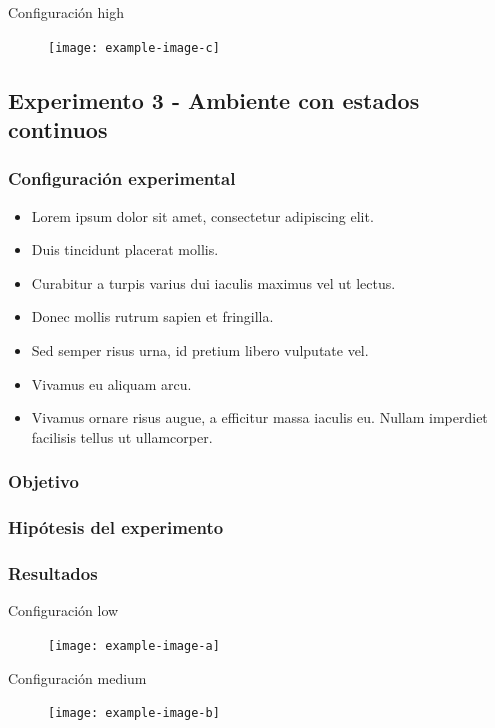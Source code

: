 Configuración high
\begin{figure}[H]
    \centering
    \texttt{[image: example-image-c]}
\end{figure}



\subsection{Experimento 3 - Ambiente con estados continuos}


\subsubsection{Configuración experimental}

\begin{itemize}
    \item  Lorem ipsum dolor sit amet, consectetur adipiscing elit. 
    \item Duis tincidunt placerat mollis. 
    \item Curabitur a turpis varius dui iaculis maximus vel ut lectus. 
    \item Donec mollis rutrum sapien et fringilla.
    \item Sed semper risus urna, id pretium libero vulputate vel. 
    \item Vivamus eu aliquam arcu. 
    \item Vivamus ornare risus augue, a efficitur massa iaculis eu. Nullam imperdiet facilisis tellus ut ullamcorper. 
\end{itemize}
\subsubsection{Objetivo}
\subsubsection{Hipótesis del experimento}
\subsubsection{Resultados}

Configuración low
\begin{figure}[H]
    \centering
    \texttt{[image: example-image-a]}
\end{figure}


Configuración medium
\begin{figure}[H]
    \centering
    \texttt{[image: example-image-b]}
\end{figure}


